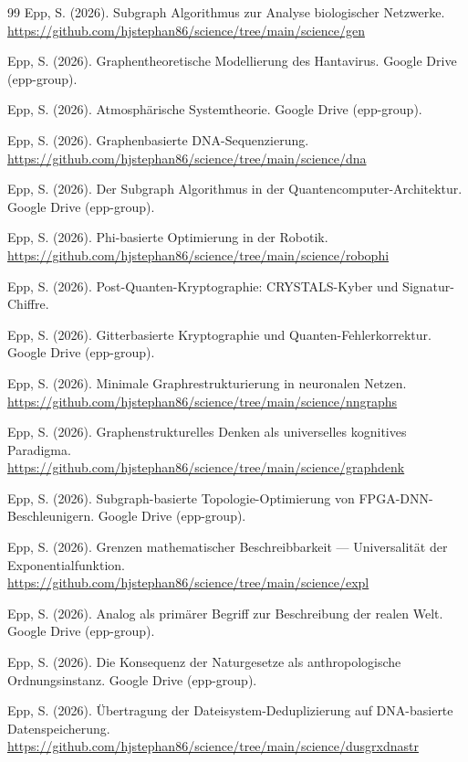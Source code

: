 ﻿\documentclass[a4paper,12pt]{article}
\theoremstyle{definition}
\begin{document}
\begin{thebibliography}{99}
Epp, S. (2026).
Subgraph Algorithmus zur Analyse biologischer Netzwerke.
\url{https://github.com/hjstephan86/science/tree/main/science/gen}

Epp, S. (2026).
Graphentheoretische Modellierung des Hantavirus.
Google Drive (epp-group).

Epp, S. (2026).
Atmosphärische Systemtheorie.
Google Drive (epp-group).

Epp, S. (2026).
Graphenbasierte DNA-Sequenzierung.
\url{https://github.com/hjstephan86/science/tree/main/science/dna}

Epp, S. (2026).
Der Subgraph Algorithmus in der Quantencomputer-Architektur.
Google Drive (epp-group).

Epp, S. (2026).
Phi-basierte Optimierung in der Robotik.
\url{https://github.com/hjstephan86/science/tree/main/science/robophi}

Epp, S. (2026).
Post-Quanten-Kryptographie: CRYSTALS-Kyber und Signatur-Chiffre.

Epp, S. (2026).
Gitterbasierte Kryptographie und Quanten-Fehlerkorrektur.
Google Drive (epp-group).

Epp, S. (2026).
Minimale Graphrestrukturierung in neuronalen Netzen.
\url{https://github.com/hjstephan86/science/tree/main/science/nngraphs}

Epp, S. (2026).
Graphenstrukturelles Denken als universelles kognitives Paradigma.
\url{https://github.com/hjstephan86/science/tree/main/science/graphdenk}

Epp, S. (2026).
Subgraph-basierte Topologie-Optimierung von FPGA-DNN-Beschleunigern.
Google Drive (epp-group).

Epp, S. (2026).
Grenzen mathematischer Beschreibbarkeit --- Universalität der Exponentialfunktion.
\url{https://github.com/hjstephan86/science/tree/main/science/expl}

Epp, S. (2026).
Analog als primärer Begriff zur Beschreibung der realen Welt.
Google Drive (epp-group).

Epp, S. (2026).
Die Konsequenz der Naturgesetze als anthropologische Ordnungsinstanz.
Google Drive (epp-group).

Epp, S. (2026).
Übertragung der Dateisystem-Deduplizierung auf DNA-basierte Datenspeicherung.
\url{https://github.com/hjstephan86/science/tree/main/science/dusgrxdnastr}

\end{thebibliography}
\end{document}
